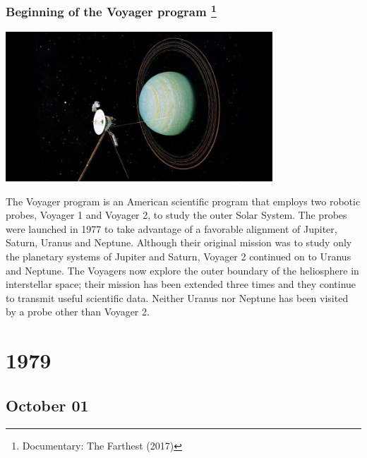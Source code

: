 \documentclass[11pt]{report}
\begin{document}
\subsection{Beginning of the Voyager program \protect\footnote{Documentary: The Farthest (2017)}}
\vspace{2mm}\begin{center}\includegraphics[width=10cm]{./img/voyagerProgram.jpg}\end{center}
The Voyager program is an American scientific program that employs two robotic probes, Voyager 1 and Voyager 2, to study the outer Solar System. The probes were launched in 1977 to take advantage of a favorable alignment of Jupiter, Saturn, Uranus and Neptune. Although their original mission was to study only the planetary systems of Jupiter and Saturn, Voyager 2 continued on to Uranus and Neptune. The Voyagers now explore the outer boundary of the heliosphere in interstellar space; their mission has been extended three times and they continue to transmit useful scientific data. Neither Uranus nor Neptune has been visited by a probe other than Voyager 2.

\chapter{1979}
\section{October 01}
\end{document}
